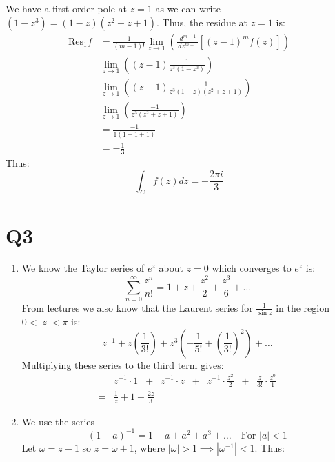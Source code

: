 \documentclass[a4paper, 11pt]{article}
\def\dd#1#2{\frac{\,d#1}{\,d#2}}
\begin{document}
\begin{multicols}{2}
	We have a first order pole at $z=1$ as we can write $(1-z^3)=(1-z)(z^2+z+1)$. Thus, the residue at $z=1$ is:
	\begin{align*}
		\text{Res}_1 f & = \frac 1{(m-1)!}\lim_{z\to 1} \left( \dd{^{m-1}}{z^{m-1}} \left[ (z-1)^m f(z) \right] \right) \\
		               & \lim_{z\to1} \left( (z-1) \frac{1}{z^3(1-z^3)} \right)                                         \\
		               & \lim_{z\to1} \left( (z-1) \frac{1}{z^3(1-z)(z^2+z+1)} \right)                                  \\
		               & \lim_{z\to1} \left(  \frac{-1}{z^3(z^2+z+1)} \right)                                           \\
		               & = \frac{-1}{1(1+1+1)}                                                                          \\
		               & = -\frac 13
	\end{align*}
	Thus:
	$$\int_C f(z)dz =-\frac{2\pi i}3$$

	\section*{Q3}
	\begin{enumerate}[label=(\alph*)]
		\item We know the Taylor series of $e^z$ about $z=0$ which converges to $e^z$ is:
		      $$\sum_{n=0}^\infty \frac {z^n}{n!}=1+z+\frac{z^2}2+\frac{z^3}6+\dots$$
		      From lectures we also know that the Laurent series for $\frac{1}{\sin z}$ in the region $0<|z|<\pi$ is:
		      $$z^{-1}+z\left( \frac 1{3!} \right) + z^3 \left(  - \frac 1{5!} + \left(\frac 1{3!}\right)^2 \right)+\dots$$
		      Multiplying these series to the third term gives:
		      \begin{align*}
			        & z^{-1}\cdot 1 \;\;+\;\; z^{-1}\cdot z  \;\;+\;\; z^{-1}\cdot \frac{z^2}2  \;\;+\;\;  \frac z{3!} \cdot \frac{z^0}1 \\
			      = & \frac 1z + 1 + \frac{2z}3
		      \end{align*}



		\item We use the series
		      $$(1-a)^{-1}=1+a+a^2+a^3+\dots \quad\text{For $|a| < 1$}$$
		      Let $\omega = z-1$ so $z=\omega+1$, where $|\omega| >1\implies |\omega^{-1}|<1$. Thus:



\end{enumerate}
\end{multicols}
\end{document}
